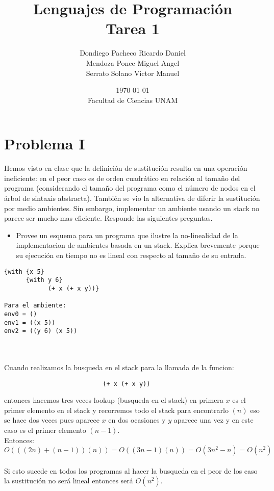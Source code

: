 \documentclass[letterpaper,11pt]{article}
\title{Lenguajes de Programación\\ Tarea 1}
\date{\today\\ Facultad de Ciencias UNAM}
\author{Dondiego Pacheco Ricardo Daniel \\
Mendoza Ponce Miguel Angel \\
Serrato Solano Victor Manuel}
\begin{document}
\maketitle

\section{Problema I}

Hemos visto en clase que la definición de sustitución resulta en una operación ineficiente: en el peor caso es de orden cuadrático en relación al tamaño del programa (considerando el tamaño del programa como el número de
nodos en el árbol de sintaxis abstracta). También se vio la alternativa de diferir la sustitución por medio ambientes. Sin embargo, implementar un ambiente usando un stack no parece ser mucho mas eficiente.
Responde las siguientes preguntas.


\begin{itemize}
\item Provee un esquema para un programa que ilustre la no-linealidad de la implementacion de ambientes basada
en un stack. Explica brevemente porque su ejecución en tiempo no es lineal con respecto al tamaño de su
entrada.
\end{itemize}

\begin{verbatim}
{with {x 5} 
      {with y 6} 
            (+ x (+ x y))}
            
Para el ambiente:
env0 = ()
env1 = ((x 5))
env2 = ((y 6) (x 5))
\end{verbatim}

\\\\

Cuando realizamos la busqueda en el stack para la llamada de la funcion: 
\begin{verbatim}
                           (+ x (+ x y))
\end{verbatim}
entonces hacemos tres veces lookup (busqueda en el stack) en primera $x$ es el primer elemento en el stack y recorremos todo el stack para encontrarlo $(n)$ eso se hace dos veces pues aparece $x$ en dos ocasiones y $y$ aparece una vez y en este caso es el primer elemento $(n-1)$.\\

Entonces:\\
$O(((2n)+(n-1))(n)) = O((3n-1)(n))=O(3n^2 -n)=O(n^2)$\\
\\Si esto sucede en todos los programas al hacer la busqueda en el peor de los caso la sustitución no será lineal entonces será $O(n^2)$.\\
\end{document}
